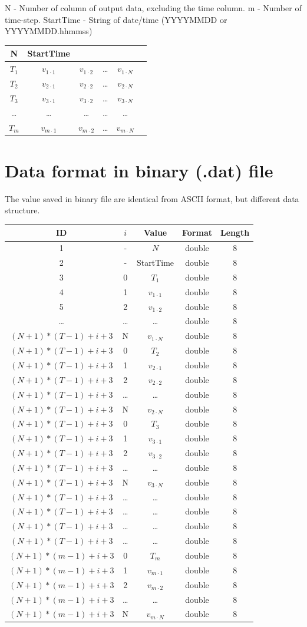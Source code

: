 \documentclass[]{scrbook}
\begin{document}
N - Number of column of output data, excluding the time column. m -
Number of time-step. StartTime - String of date/time (YYYYMMDD or
YYYYMMDD.hhmmss)

\begin{longtable}[]{@{}cccccc@{}}
\toprule
N & StartTime & & & &\tabularnewline
\midrule
\endhead
\(T_1\) & \(v_{1 \cdot 1}\) & \(v_{1 \cdot 2}\) & \ldots{} &
\(v_{1 \cdot N}\) &\tabularnewline
\(T_2\) & \(v_{2 \cdot 1}\) & \(v_{2 \cdot 2}\) & \ldots{} &
\(v_{2 \cdot N}\) &\tabularnewline
\(T_3\) & \(v_{3 \cdot 1}\) & \(v_{3 \cdot 2}\) & \ldots{} &
\(v_{3 \cdot N}\) &\tabularnewline
\ldots{} & \ldots{} & \ldots{} & \ldots{} & \ldots{} &\tabularnewline
\(T_{m}\) & \(v_{m \cdot 1}\) & \(v_{m \cdot 2}\) & \ldots{} &
\(v_{m \cdot N}\) &\tabularnewline
\bottomrule
\end{longtable}

\section{Data format in binary (.dat)
file}\label{data-format-in-binary-.dat-file}

The value saved in binary file are identical from ASCII format, but
different data structure.

\begin{longtable}[]{@{}ccccc@{}}
\toprule
ID & \(i\) & Value & Format & Length\tabularnewline
\midrule
\endhead
1 & - & \(N\) & double & 8\tabularnewline
2 & - & StartTime & double & 8\tabularnewline
3 & 0 & \(T_1\) & double & 8\tabularnewline
4 & 1 & \(v_{1 \cdot 1}\) & double & 8\tabularnewline
5 & 2 & \(v_{1 \cdot 2}\) & double & 8\tabularnewline
\ldots{} & \ldots{} & \ldots{} & double & 8\tabularnewline
\((N+1) * (T-1) + i +3\) & N & \(v_{1 \cdot N}\) & double &
8\tabularnewline
\((N+1) * (T-1) + i +3\) & 0 & \(T_2\) & double & 8\tabularnewline
\((N+1) * (T-1) + i +3\) & 1 & \(v_{2 \cdot 1}\) & double &
8\tabularnewline
\((N+1) * (T-1) + i +3\) & 2 & \(v_{2 \cdot 2}\) & double &
8\tabularnewline
\((N+1) * (T-1) + i +3\) & \ldots{} & \ldots{} & double &
8\tabularnewline
\((N+1) * (T-1) + i +3\) & N & \(v_{2 \cdot N}\) & double &
8\tabularnewline
\((N+1) * (T-1) + i +3\) & 0 & \(T_3\) & double & 8\tabularnewline
\((N+1) * (T-1) + i +3\) & 1 & \(v_{3 \cdot 1}\) & double &
8\tabularnewline
\((N+1) * (T-1) + i +3\) & 2 & \(v_{3 \cdot 2}\) & double &
8\tabularnewline
\((N+1) * (T-1) + i +3\) & \ldots{} & \ldots{} & double &
8\tabularnewline
\((N+1) * (T-1) + i +3\) & N & \(v_{3 \cdot N}\) & double &
8\tabularnewline
\((N+1) * (T-1) + i +3\) & \ldots{} & \ldots{} & double &
8\tabularnewline
\((N+1) * (T-1) + i +3\) & \ldots{} & \ldots{} & double &
8\tabularnewline
\((N+1) * (T-1) + i +3\) & \ldots{} & \ldots{} & double &
8\tabularnewline
\((N+1) * (T-1) + i +3\) & \ldots{} & \ldots{} & double &
8\tabularnewline
\((N+1) * (m-1) + i +3\) & 0 & \(T_{m}\) & double & 8\tabularnewline
\((N+1) * (m-1) + i +3\) & 1 & \(v_{m \cdot 1}\) & double &
8\tabularnewline
\((N+1) * (m-1) + i +3\) & 2 & \(v_{m \cdot 2}\) & double &
8\tabularnewline
\((N+1) * (m-1) + i +3\) & \ldots{} & \ldots{} & double &
8\tabularnewline
\((N+1) * (m-1) + i +3\) & N & \(v_{m \cdot N}\) & double &
8\tabularnewline
\bottomrule
\end{longtable}
\end{document}
